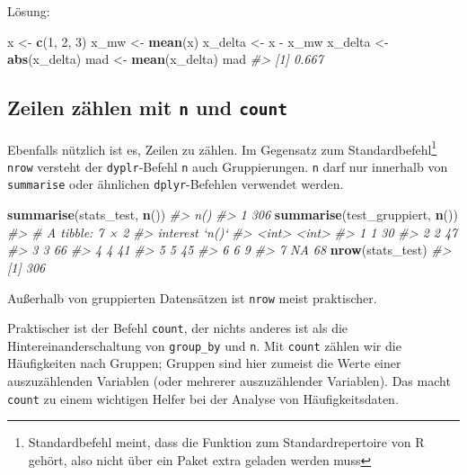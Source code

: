 \documentclass[12pt,ngerman,]{book}
\makeatletter
\newenvironment{Shaded}{\begin{snugshade}}{\end{snugshade}}
\newcommand{\KeywordTok}[1]{\textcolor[rgb]{0.13,0.29,0.53}{\textbf{{#1}}}}
\newcommand{\DecValTok}[1]{\textcolor[rgb]{0.00,0.00,0.81}{{#1}}}
\newcommand{\StringTok}[1]{\textcolor[rgb]{0.31,0.60,0.02}{{#1}}}
\newcommand{\CommentTok}[1]{\textcolor[rgb]{0.56,0.35,0.01}{\textit{{#1}}}}
\newcommand{\NormalTok}[1]{{#1}}
\let\rmarkdownfootnote\footnote%
\def\footnote{\protect\rmarkdownfootnote}
\newenvironment{kframe}{%
\medskip{}
\setlength{\fboxsep}{.8em}
 \def\at@end@of@kframe{}%
 \ifinner\ifhmode%
  \def\at@end@of@kframe{\end{minipage}}%
  \begin{minipage}{\columnwidth}%
 \fi\fi%
 \def\FrameCommand##1{\hskip\@totalleftmargin \hskip-\fboxsep
 \colorbox{shadecolor}{##1}\hskip-\fboxsep
     \hskip-\linewidth \hskip-\@totalleftmargin \hskip\columnwidth}%
 \MakeFramed {\advance\hsize-\width
   \@totalleftmargin\z@ \linewidth\hsize
   \@setminipage}}%
 {\par\unskip\endMakeFramed%
 \at@end@of@kframe}
\renewenvironment{Shaded}{\begin{kframe}}{\end{kframe}}
\makeatother
\begin{document}
Lösung:

\begin{Shaded}
\begin{Highlighting}[]
\NormalTok{x <-}\StringTok{ }\KeywordTok{c}\NormalTok{(}\DecValTok{1}\NormalTok{, }\DecValTok{2}\NormalTok{, }\DecValTok{3}\NormalTok{)}
\NormalTok{x_mw <-}\StringTok{ }\KeywordTok{mean}\NormalTok{(x)}
\NormalTok{x_delta <-}\StringTok{ }\NormalTok{x -}\StringTok{ }\NormalTok{x_mw}
\NormalTok{x_delta <-}\StringTok{ }\KeywordTok{abs}\NormalTok{(x_delta)}
\NormalTok{mad <-}\StringTok{ }\KeywordTok{mean}\NormalTok{(x_delta)}
\NormalTok{mad}
\CommentTok{#> [1] 0.667}
\end{Highlighting}
\end{Shaded}

\subsection{\texorpdfstring{Zeilen zählen mit \texttt{n} und
\texttt{count}}{Zeilen zählen mit n und count}}\label{zeilen-zahlen-mit-n-und-count}

Ebenfalls nützlich ist es, Zeilen zu zählen. Im Gegensatz zum
Standardbefehl\footnote{Standardbefehl meint, dass die Funktion zum
  Standardrepertoire von R gehört, also nicht über ein Paket extra
  geladen werden muss} \texttt{nrow} versteht der \texttt{dyplr}-Befehl
\texttt{n} auch Gruppierungen. \texttt{n} darf nur
innerhalb von \texttt{summarise} oder ähnlichen \texttt{dplyr}-Befehlen
verwendet werden.

\begin{Shaded}
\begin{Highlighting}[]
\KeywordTok{summarise}\NormalTok{(stats_test, }\KeywordTok{n}\NormalTok{())}
\CommentTok{#>   n()}
\CommentTok{#> 1 306}
\KeywordTok{summarise}\NormalTok{(test_gruppiert, }\KeywordTok{n}\NormalTok{())}
\CommentTok{#> # A tibble: 7 × 2}
\CommentTok{#>   interest `n()`}
\CommentTok{#>      <int> <int>}
\CommentTok{#> 1        1    30}
\CommentTok{#> 2        2    47}
\CommentTok{#> 3        3    66}
\CommentTok{#> 4        4    41}
\CommentTok{#> 5        5    45}
\CommentTok{#> 6        6     9}
\CommentTok{#> 7       NA    68}
\KeywordTok{nrow}\NormalTok{(stats_test)}
\CommentTok{#> [1] 306}
\end{Highlighting}
\end{Shaded}

Außerhalb von gruppierten Datensätzen ist \texttt{nrow} meist
praktischer.

Praktischer ist der Befehl \texttt{count}, der
nichts anderes ist als die Hintereinanderschaltung von
\texttt{group\_by} und \texttt{n}. Mit \texttt{count} zählen wir die
Häufigkeiten nach Gruppen; Gruppen sind hier zumeist die Werte einer
auszuzählenden Variablen (oder mehrerer auszuzählender Variablen). Das
macht \texttt{count} zu einem wichtigen Helfer bei der Analyse von
Häufigkeitsdaten.
\end{document}
